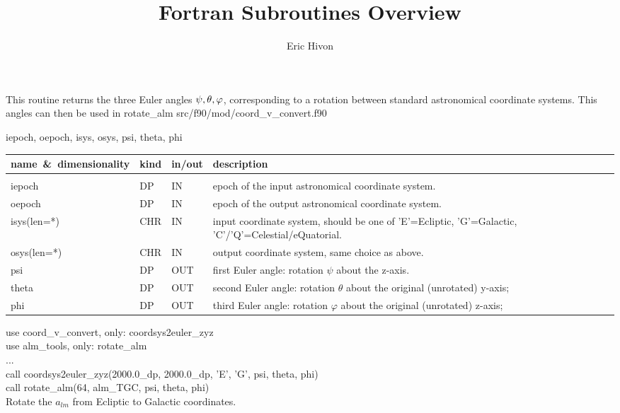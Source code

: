 \sloppy


\title{\healpix Fortran Subroutines Overview}
 \section[coordsys2euler\_zyz]{ }
\label{sub:coordsys2euler_zyz}
\author{Eric Hivon}

\begin{facility}
{This routine returns the three Euler angles $\psi, \theta, \varphi
$, corresponding to a rotation between standard astronomical
coordinate systems. This angles can then be used in rotate\_alm}
{src/f90/mod/coord\_v\_convert.f90}
\end{facility}

\begin{f90format}
{iepoch, oepoch, isys, osys, psi, theta, phi}
\end{f90format}

\begin{arguments}
{
\begin{tabular}{p{0.26\hsize} p{0.05\hsize} p{0.09\hsize} p{0.50\hsize}} \hline  
\textbf{name~\&~dimensionality} & \textbf{kind} & \textbf{in/out} & \textbf{description} \\ \hline
                   &   &   &                           \\ %
iepoch & DP & IN & epoch of the input astronomical coordinate system.\\
oepoch & DP & IN & epoch of the output astronomical coordinate system.\\
isys(len=*) & CHR & IN & input coordinate system, should be one of 'E'=Ecliptic, 'G'=Galactic, 'C'/'Q'=Celestial/eQuatorial.\\
osys(len=*) & CHR & IN & output coordinate system, same choice as above.\\
psi	& DP & OUT & first Euler angle: rotation $\psi$ about the z-axis. \\
theta	& DP & OUT & second Euler angle: rotation $\theta$ about the original
(unrotated) y-axis; \\
phi	& DP & OUT & third Euler angle: rotation $\varphi$ about the original (unrotated) z-axis;
\end{tabular}
}
\end{arguments}

\begin{example}
{
use coord\_v\_convert, only: coordsys2euler\_zyz \\
use alm\_tools, only: rotate\_alm \\
...\\
call coordsys2euler\_zyz(2000.0\_dp, 2000.0\_dp, 'E', 'G', psi, theta, phi) \\
call rotate\_alm(64, alm\_TGC, psi, theta, phi)  \\
}
{
Rotate the $a_{lm}$ from Ecliptic to Galactic coordinates.
}
\end{example}


